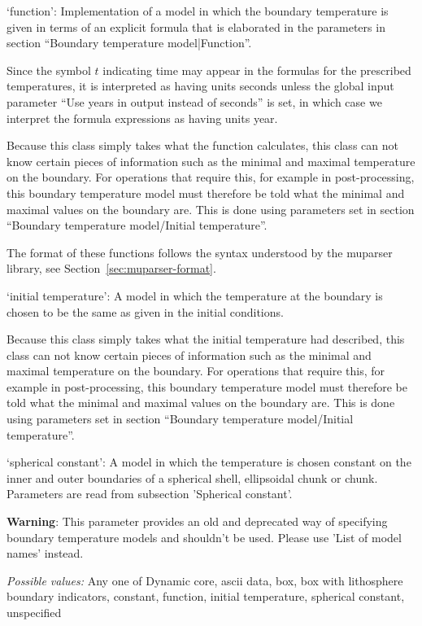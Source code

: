 \begin{itemize}
`function': Implementation of a model in which the boundary temperature is given in terms of an explicit formula that is elaborated in the parameters in section ``Boundary temperature model|Function''. 

Since the symbol $t$ indicating time may appear in the formulas for the prescribed temperatures, it is interpreted as having units seconds unless the global input parameter ``Use years in output instead of seconds'' is set, in which case we interpret the formula expressions as having units year.

Because this class simply takes what the function calculates, this class can not know certain pieces of information such as the minimal and maximal temperature on the boundary. For operations that require this, for example in post-processing, this boundary temperature model must therefore be told what the minimal and maximal values on the boundary are. This is done using parameters set in section ``Boundary temperature model/Initial temperature''.

The format of these functions follows the syntax understood by the muparser library, see Section~\ref{sec:muparser-format}.

`initial temperature': A model in which the temperature at the boundary is chosen to be the same as given in the initial conditions.

Because this class simply takes what the initial temperature had described, this class can not know certain pieces of information such as the minimal and maximal temperature on the boundary. For operations that require this, for example in post-processing, this boundary temperature model must therefore be told what the minimal and maximal values on the boundary are. This is done using parameters set in section ``Boundary temperature model/Initial temperature''.

`spherical constant': A model in which the temperature is chosen constant on the inner and outer boundaries of a spherical shell, ellipsoidal chunk or chunk. Parameters are read from subsection 'Spherical constant'.

\textbf{Warning}: This parameter provides an old and deprecated way of specifying boundary temperature models and shouldn't be used. Please use 'List of model names' instead.


{\it Possible values:} Any one of Dynamic core, ascii data, box, box with lithosphere boundary indicators, constant, function, initial temperature, spherical constant, unspecified
\end{itemize}



